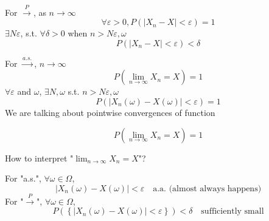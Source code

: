 For $\overset{P}{\to}$, as $n\to \infty$
\[\forall \varepsilon> 0, P(\left|X_n - X\right| < \varepsilon) = 1\]
$\exists N\varepsilon$, s.t. $\forall \delta >0$ when $n > N\varepsilon, \omega$
\[P(\left|X_n - X\right|<\varepsilon)<\delta\]

For $\overset{a.s.}{\longrightarrow}$, $n\to \infty$
\[P(\lim_{n\to\infty}X_n = X) = 1\]
$\forall \varepsilon$ and $\omega$, $\exists N, \omega$ s.t. $n>N\varepsilon, \omega$
\[P(\left|X_n(\omega) - X(\omega) \right|<\varepsilon)=1\]
We are talking about pointwise convergences of function

\[P(\lim_{n\to\infty} X_n = X) = 1\]
\begin{center}How to interpret "$\lim_{n\to\infty}X_n = X$"?\end{center}
For "a.s.", $\forall \omega \in \Omega$, 
\[\left|X_n(\omega) - X(\omega)\right|<\varepsilon \quad \text{a.a. (almost always happens)}\]
For "$\overset{P}{\to}$", $\forall\omega \in \Omega$, 
\[P(\left\{\left|X_n(\omega) - X(\omega)\right|<\varepsilon\right\})<\delta \quad \text{sufficiently small}\]